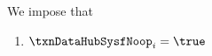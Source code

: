 \begin{center}
\end{center}
We impose that
\begin{enumerate}
	\item $\txnDataHubSysfNoop _{i} = \true$
\end{enumerate}
